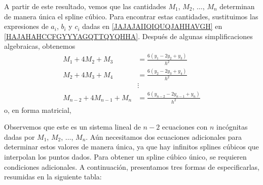 A partir de este resultado, vemos que las cantidades $M_1$, $M_2$, $\dots$, $M_n$ determinan de manera única el spline cúbico. Para encontrar estas cantidades, sustituimos las expresiones de $a_i$, $b_i$ y $c_i$ dadas en \eqref{JAJAJAIIQIQUQJAHHAVGH} en \eqref{HAJAHAHCCFGYYYAGQTTQYQHHA}. Después de algunas simplificaciones algebraicas, obtenemos
\begin{equation}
    \begin{aligned}
        M_1 + 4M_2 + M_3 & = \frac{6(y_1 - 2y_2 + y_3)}{h^2} \\
        M_2 + 4M_3 + M_4 & = \frac{6(y_2 - 2y_3 + y_4)}{h^2} \\
        & \vdots \\
        M_{n-2} + 4M_{n-1} + M_n & = \frac{6(y_{n-2} - 2y_{n-1} + y_n)}{h^2}
    \end{aligned} \label{JAJAHAGYATTQTTFFFQTTTTQ}
\end{equation}
o, en forma matricial,
\begin{matrizn}
\end{matrizn}
Observemos que este es un sistema lineal de $n - 2$ ecuaciones con $n$ incógnitas dadas por $M_1$, $M_2$, $\dots$, $M_n$. Aún necesitamos dos ecuaciones adicionales para determinar estos valores de manera única, ya que hay infinitos splines cúbicos que interpolan los puntos dados. Para obtener un spline cúbico único, se requieren condiciones adicionales. A continuación, presentamos tres formas de especificarlas, resumidas en la siguiente tabla:\newpage
